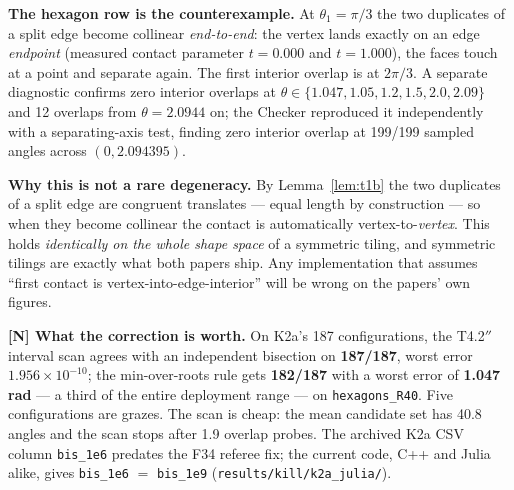 \documentclass[11pt,a4paper]{article}
\theoremstyle{definition}
\newcommand{\file}[1]{\texttt{\small #1}}
\begin{document}
\noindent
\textbf{The hexagon row is the counterexample.} At $\theta_1=\pi/3$ the two duplicates of a
split edge become collinear \emph{end-to-end}: the vertex lands exactly on an edge
\emph{endpoint} (measured contact parameter $t=0.000$ and $t=1.000$), the faces touch at a
point and separate again. The first interior overlap is at $2\pi/3$. A separate diagnostic
confirms zero interior overlaps at $\theta\in\{1.047,1.05,1.2,1.5,2.0,2.09\}$ and 12 overlaps
from $\theta=2.0944$ on; the Checker reproduced it independently with a separating-axis test,
finding zero interior overlap at 199/199 sampled angles across $(0,2.094395)$.

\textbf{Why this is not a rare degeneracy.} By Lemma~\ref{lem:t1b} the two duplicates of a
split edge are congruent translates --- equal length by construction --- so when they become
collinear the contact is automatically vertex-to-\emph{vertex}. This holds
\emph{identically on the whole shape space} of a symmetric tiling, and symmetric tilings are
exactly what both papers ship. Any implementation that assumes ``first contact is
vertex-into-edge-interior'' will be wrong on the papers' own figures.

\textbf{[N] What the correction is worth.} On K2a's 187 configurations, the T4.2$''$ interval
scan agrees with an independent bisection on \textbf{187/187}, worst error
$1.956\times10^{-10}$; the min-over-roots rule gets \textbf{182/187} with a worst error of
\textbf{1.047 rad} --- a third of the entire deployment range --- on \file{hexagons\_R40}.
Five configurations are grazes. The scan is cheap: the mean candidate set has 40.8 angles and
the scan stops after 1.9 overlap probes.
The archived K2a CSV column \file{bis\_1e6} predates the F34 referee fix; the current code, C++ and
Julia alike, gives \file{bis\_1e6} $=$ \file{bis\_1e9} (\file{results/kill/k2a\_julia/}).
\end{document}
